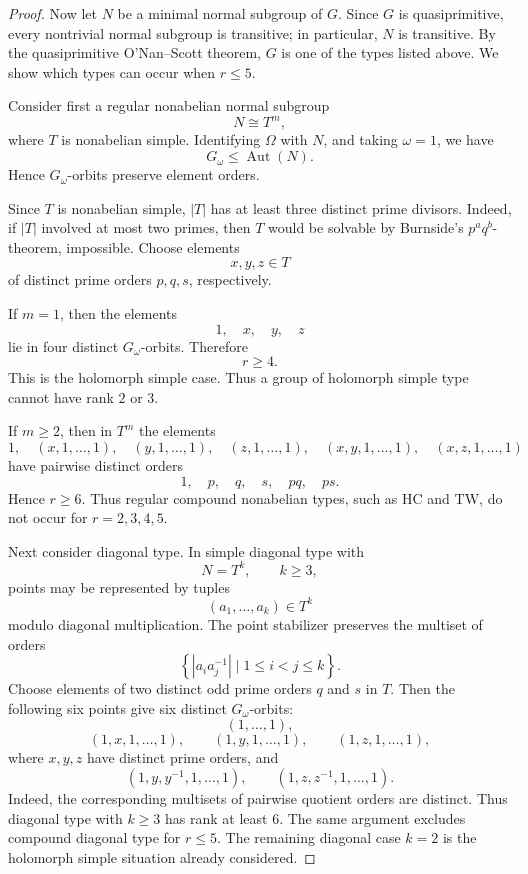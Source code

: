 \begin{proof}
    Now let \(N\) be a minimal normal subgroup of \(G\). Since \(G\) is
    quasiprimitive, every nontrivial normal subgroup is transitive; in particular, \(N\)
    is transitive. By the quasiprimitive O'Nan--Scott theorem, \(G\) is one of the
    types listed above. We show which types can occur when \(r\leq 5\).
    
    Consider first a regular nonabelian normal subgroup
    \[
    N\cong T^m,
    \]
    where \(T\) is nonabelian simple. Identifying \(\Omega\) with \(N\), and taking
    \(\omega=1\), we have
    \[
    G_\omega\leq \operatorname{Aut}(N).
    \]
    Hence \(G_\omega\)-orbits preserve element orders.
    
    Since \(T\) is nonabelian simple, \(|T|\) has at least three distinct prime divisors.
    Indeed, if \(|T|\) involved at most two primes, then \(T\) would be solvable by
    Burnside's \(p^aq^b\)-theorem, impossible. Choose elements
    \[
    x,y,z\in T
    \]
    of distinct prime orders \(p,q,s\), respectively.
    
    If \(m=1\), then the elements
    \[
    1,\quad x,\quad y,\quad z
    \]
    lie in four distinct \(G_\omega\)-orbits. Therefore
    \[
    r\geq 4.
    \]
    This is the holomorph simple case. Thus a group of holomorph simple type cannot
    have rank \(2\) or \(3\).
    
    If \(m\geq 2\), then in \(T^m\) the elements
    \[
    1,\quad
    (x,1,\ldots,1),\quad
    (y,1,\ldots,1),\quad
    (z,1,\ldots,1),\quad
    (x,y,1,\ldots,1),\quad
    (x,z,1,\ldots,1)
    \]
    have pairwise distinct orders
    \[
    1,\quad p,\quad q,\quad s,\quad pq,\quad ps.
    \]
    Hence \(r\geq 6\). Thus regular compound nonabelian types, such as
    \(\mathrm{HC}\) and \(\mathrm{TW}\), do not occur for \(r=2,3,4,5\).
    
    Next consider diagonal type. In simple diagonal type with
    \[
    N=T^k,\qquad k\geq 3,
    \]
    points may be represented by tuples
    \[
    (a_1,\ldots,a_k)\in T^k
    \]
    modulo diagonal multiplication. The point stabilizer preserves the multiset of
    orders
    \[
    \left\{
    |a_i a_j^{-1}| \mid 1\leq i<j\leq k
    \right\}.
    \]
    Choose elements of two distinct odd prime orders \(q\) and \(s\) in \(T\). Then the
    following six points give six distinct \(G_\omega\)-orbits:
    \[
    (1,\ldots,1),
    \]
    \[
    (1,x,1,\ldots,1),\qquad
    (1,y,1,\ldots,1),\qquad
    (1,z,1,\ldots,1),
    \]
    where \(x,y,z\) have distinct prime orders, and
    \[
    (1,y,y^{-1},1,\ldots,1),
    \qquad
    (1,z,z^{-1},1,\ldots,1).
    \]
    Indeed, the corresponding multisets of pairwise quotient orders are distinct.
    Thus diagonal type with \(k\geq 3\) has rank at least \(6\). The same argument
    excludes compound diagonal type for \(r\leq 5\). The remaining diagonal case
    \(k=2\) is the holomorph simple situation already considered.
    

\end{proof}
